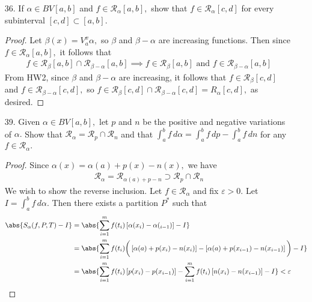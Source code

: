 \documentclass{article}
\begin{document}
\begin{itemize}
	\item[36.] If $\alpha\in BV[a, b]$ and $f\in \mathcal R_\alpha[a, b],$ show that $f\in \mathcal R_\alpha[c, d]$ for every subinterval $[c, d]\subset[a, b].$
		\begin{proof}
			Let $\beta(x)=V_a^x\alpha,$ so $\beta$ and $\beta-\alpha$ are increasing functions. Then since $f\in \mathcal R_\alpha[a, b],$ it follows that
			\begin{align*}
				f\in \mathcal R_\beta[a, b]\cap\mathcal R_{\beta-\alpha}[a, b] \implies f\in \mathcal R_\beta[a, b] \text{ and } f\in\mathcal R_{\beta-\alpha}[a, b]
			\end{align*}
			From HW2, since $\beta$ and $\beta-\alpha$ are increasing, it follows that $f\in \mathcal R_\beta[c, d]$ and $f\in\mathcal R_{\beta-\alpha}[c, d],$ so $f\in \mathcal R_{\beta}[c, d]\cap\mathcal R_{\beta-\alpha}[c, d] = R_\alpha[c, d],$ as desired.
		\end{proof}

	\item[39.] Given $\alpha\in BV[a, b],$ let $p$ and $n$ be the positive and negative variations of $\alpha.$ Show that $\mathcal R_\alpha = \mathcal R_p \cap \mathcal R_n$ and that $\int_a^b f\, d\alpha = \int_a^b f\, dp - \int_a^b f\, dn$ for any $f\in\mathcal R_\alpha.$
		\begin{proof}
			Since $\alpha(x)=\alpha(a)+p(x)-n(x),$ we have
			\begin{align*}
				\mathcal R_{\alpha} = \mathcal R_{\alpha(a)+p-n} \supset \mathcal R_p\cap \mathcal R_n
			\end{align*}
			We wish to show the reverse inclusion. Let $f\in \mathcal R_\alpha$ and fix $\varepsilon>0.$ Let $I=\int_a^b f\, d\alpha.$ Then there exists a partition $P^*$ such that
			\begin{align*}
				\abs{S_\alpha(f, P, T)-I} &= \abs{\sum_{i=1}^{m} f(t_i)\left[ \alpha(x_i)-\alpha(_{i-1}) \right]- I} \\
				&= \abs{\sum_{i=1}^{m} f(t_i)\bigg(\left[ \alpha(a)+p(x_i)-n(x_i) \right] - \left[ \alpha(a)+p(x_{i-1}) - n(x_{i-1}) \right]\bigg)-I} \\ 
				&= \abs{\sum_{i=1}^{m} f(t_i)\left[ p(x_i)-p(x_{i-1}) \right] - \sum_{i=1}^{m} f(t_i)\left[ n(x_i)-n(x_{i-1}) \right] - I} < \varepsilon
			\end{align*}
		\end{proof}


\end{itemize}
\end{document}
